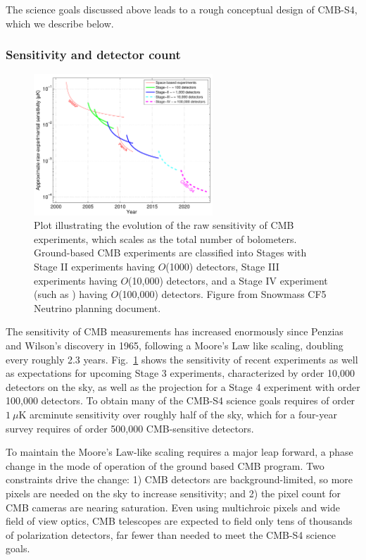 The science goals discussed above leads to a rough conceptual design of CMB-S4, which we describe below.

\subsubsection{Sensitivity and detector count}

\begin{figure}[t]
\centering \includegraphics[width=0.6\textwidth]{Intro/expt_progress.pdf}
\caption{Plot illustrating the evolution of the raw sensitivity of CMB
  experiments, which scales as the total number of
  bolometers. Ground-based CMB experiments are classified into Stages
  with Stage II experiments having $O$(1000) detectors, Stage III
  experiments having $O$(10,000) detectors, and a Stage IV experiment
  (such as \cmbexp) having $O$(100,000) detectors. Figure from Snowmass  CF5
  Neutrino planning document.}
\label{fig:expt_progress-intro}
\end{figure}

The sensitivity of CMB measurements has increased enormously since Penzias and Wilson's discovery in 1965, following a Moore's Law like scaling, doubling every roughly 2.3 years. Fig.~\ref{fig:expt_progress-intro} shows the sensitivity of recent experiments as well as expectations for upcoming Stage 3 experiments, characterized by order 10,000 detectors on the sky, as well as the projection for a Stage 4 experiment with order 100,000 detectors. To obtain many of the CMB-S4 science goals requires of order $1~\mu$K arcminute sensitivity over roughly half of the sky, which for a four-year survey requires of order 500,000 CMB-sensitive detectors. 

To maintain the Moore's Law-like scaling requires a major leap forward, a phase change in the mode of operation of the ground based CMB program.  Two constraints drive the change:  1) CMB detectors are background-limited, so more pixels are needed on the sky to increase sensitivity; and 2) the pixel count for CMB cameras are nearing saturation.  Even using multichroic pixels and wide field of view optics, CMB telescopes are expected to field only tens of thousands of polarization detectors, far fewer than needed to meet the CMB-S4 science goals. 

